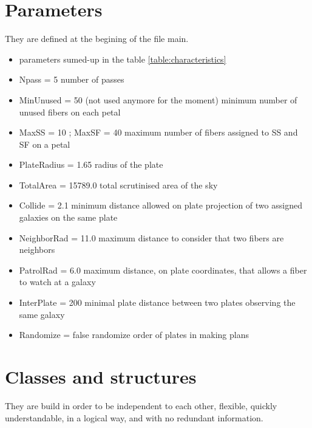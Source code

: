 \documentclass{extarticle}
\begin{document}
\begin{multicols}{2}
\section{Parameters}
They are defined at the begining of the file main.
\begin{itemize} 
	\item parameters sumed-up in the table \ref{table:characteristics}
	\item Npass = 5 number of passes
	\item MinUnused = 50 (not used anymore for the moment) minimum number of unused fibers on each petal
	\item MaxSS = 10 ; MaxSF = 40 maximum number of fibers assigned to SS and SF on a petal
	\item PlateRadius = 1.65 radius of the plate
	\item TotalArea = 15789.0 total scrutinised area of the sky
	\item Collide = 2.1 minimum distance allowed on plate projection of two assigned galaxies on the same plate
	\item NeighborRad = 11.0 maximum distance to consider that two fibers are neighbors
	\item PatrolRad = 6.0 maximum distance, on plate coordinates, that allows a fiber to watch at a galaxy
	\item InterPlate = 200 minimal plate distance between two plates observing the same galaxy
	\item Randomize = false randomize order of plates in making plans
\end{itemize} 


\section{Classes and structures}
They are build in order to be independent to each other, flexible, quickly understandable, in a logical way, and with no redundant information.

\end{multicols}
\end{document}
